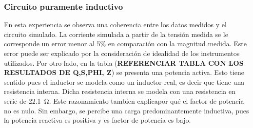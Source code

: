 \subsubsection{Circuito puramente inductivo}

En esta experiencia se observa una coherencia entre los datos medidos y el circuito simulado. La corriente simulada a partir de la tensión medida se le corresponde un error menor al 5\% en comparación con la magnitud medida. Este error puede ser explicado por la consideración de idealidad de los instrumentos utilizados. 
Por otro lado, en la tabla (\textbf{REFERENCIAR TABLA CON LOS RESULTADOS DE Q,S,PHI, Z}) se presenta una potencia activa. Esto tiene sentido pues el inductor se modela como un inductor real, es decir que tiene una resistencia interna. Dicha resistencia interna se modela con una resistencia en serie de \SI{22.1}{\ohm}. Este razonamiento tambien explicapor qué el factor de potencia no es nulo. Sin embargo, se percibe una carga predominantemente inductiva, pues la potencia reactiva es positiva y es factor de potencia es bajo.

